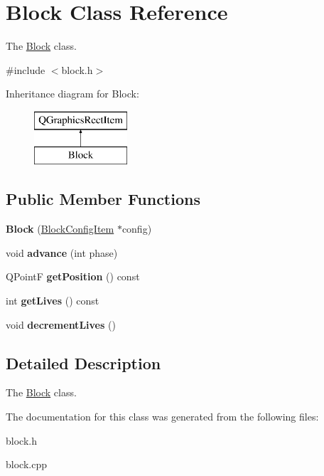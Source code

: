 \hypertarget{classBlock}{\section{Block Class Reference}
\label{classBlock}
}


The \hyperlink{classBlock}{Block} class.  




{\ttfamily \#include $<$block.\-h$>$}

Inheritance diagram for Block\-:\begin{figure}[H]
\begin{center}
\leavevmode
\includegraphics[height=2.000000cm]{classBlock}
\end{center}
\end{figure}
\subsection*{Public Member Functions}
\begin{DoxyCompactItemize}
\item 
\hypertarget{classBlock_af21c73da78352f1ec4d36b9725533b8f}{{\bfseries Block} (\hyperlink{classBlockConfigItem}{Block\-Config\-Item} $\ast$config)}\label{classBlock_af21c73da78352f1ec4d36b9725533b8f}

\item 
\hypertarget{classBlock_ae0ae7cd39933b1b5a856473c3ed0c8bc}{void {\bfseries advance} (int phase)}\label{classBlock_ae0ae7cd39933b1b5a856473c3ed0c8bc}

\item 
\hypertarget{classBlock_ab12fdff5173a545366df5e01e91588f1}{Q\-Point\-F {\bfseries get\-Position} () const }\label{classBlock_ab12fdff5173a545366df5e01e91588f1}

\item 
\hypertarget{classBlock_a4a30ffe76ac7d5002d1f6a600bf8635c}{int {\bfseries get\-Lives} () const }\label{classBlock_a4a30ffe76ac7d5002d1f6a600bf8635c}

\item 
\hypertarget{classBlock_a374a82896efe68591942d76c4209605a}{void {\bfseries decrement\-Lives} ()}\label{classBlock_a374a82896efe68591942d76c4209605a}

\end{DoxyCompactItemize}


\subsection{Detailed Description}
The \hyperlink{classBlock}{Block} class. 

The documentation for this class was generated from the following files\-:\begin{DoxyCompactItemize}
\item 
block.\-h\item 
block.\-cpp\end{DoxyCompactItemize}
